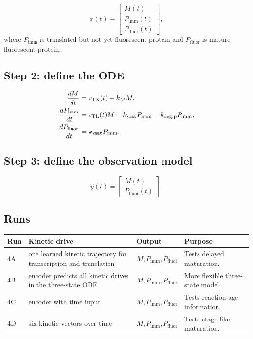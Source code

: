 \documentclass[11pt]{article}
\newcommand{\TX}{\mathrm{TX}}
\newcommand{\TL}{\mathrm{TL}}
\newcommand{\degp}{\mathrm{deg,p}}
\newcommand{\fluor}{\mathrm{fluor}}
\begin{document}
\begin{equation}
    x(t)=
    \begin{bmatrix}
        M(t)\\
        P_{\mathrm{imm}}(t)\\
        P_{\fluor}(t)
    \end{bmatrix},
\end{equation}
where $P_{\mathrm{imm}}$ is translated but not yet fluorescent protein and $P_{\fluor}$ is mature fluorescent protein.

\subsection{Step 2: define the ODE}

\begin{align}
    \frac{dM}{dt} &= v_{\TX}(t)-k_M M, \\
    \frac{dP_{\mathrm{imm}}}{dt} &= v_{\TL}(t)M-k_{\mat}P_{\mathrm{imm}}-k_{\degp}P_{\mathrm{imm}}, \\
    \frac{dP_{\fluor}}{dt} &= k_{\mat}P_{\mathrm{imm}}.
\end{align}

\subsection{Step 3: define the observation model}

\begin{equation}
    \widehat{y}(t)=
    \begin{bmatrix}
        M(t)\\
        P_{\fluor}(t)
    \end{bmatrix}.
\end{equation}

\subsection{Runs}

\begin{center}
\begin{tabularx}{\textwidth}{lllX}
\toprule
Run & Kinetic drive & Output & Purpose \\
\midrule
4A & one learned kinetic trajectory for transcription and translation & $M,P_{\mathrm{imm}},P_{\fluor}$ & Tests delayed maturation. \\
4B & encoder predicts all kinetic drives in the three-state ODE & $M,P_{\mathrm{imm}},P_{\fluor}$ & More flexible three-state model. \\
4C & encoder with time input & $M,P_{\mathrm{imm}},P_{\fluor}$ & Tests reaction-age information. \\
4D & six kinetic vectors over time & $M,P_{\mathrm{imm}},P_{\fluor}$ & Tests stage-like maturation. \\
\bottomrule
\end{tabularx}
\end{center}
\end{document}
